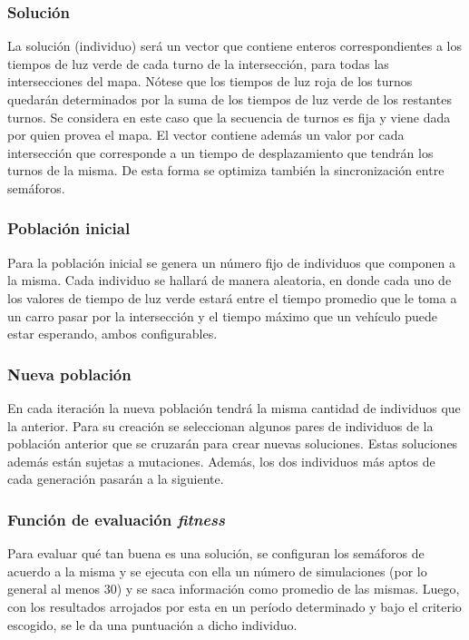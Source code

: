 \documentclass[colorinlistoftodos,twoside,twocolumn]{article} %
\begin{document}
	\subsubsection{Solución}
	
	La solución (individuo) será un vector que contiene enteros correspondientes a los tiempos de luz verde de cada turno de la intersección, para todas las intersecciones del mapa. N\'otese que los tiempos de luz roja de los turnos quedar\'an determinados por la suma de los tiempos de luz verde de los restantes turnos. Se considera en este caso que la secuencia de turnos es fija y viene dada por quien provea el mapa. El vector contiene adem\'as un valor por cada intersecci\'on que corresponde a un tiempo de desplazamiento que tendr\'an los turnos de la misma. De esta forma se optimiza tambi\'en la sincronizaci\'on entre sem\'aforos. 
	
	\subsubsection{Población inicial}
	
	Para  la población inicial se genera un n\'umero fijo de individuos que componen a la misma. Cada individuo se hallará de manera aleatoria, en donde cada uno de los valores de tiempo de luz verde estará entre el tiempo promedio que le toma a un carro pasar por la intersección y el tiempo máximo que un vehículo puede estar esperando, ambos configurables. 
	
	\subsubsection{Nueva población}
	En cada iteraci\'on la nueva poblaci\'on tendr\'a la misma cantidad de individuos que la anterior. Para su creaci\'on se seleccionan algunos pares de individuos de la poblaci\'on anterior que se cruzar\'an para crear nuevas soluciones. Estas soluciones adem\'as est\'an sujetas a mutaciones. Adem\'as, los dos individuos m\'as aptos de cada generaci\'on pasar\'an a la siguiente.  
	
	\subsubsection{Función de evaluación \textit{fitness}}
	
	Para evaluar qu\'e tan buena es una soluci\'on, se configuran los sem\'aforos de acuerdo a la misma y se ejecuta con ella un n\'umero de simulaciones (por lo general al menos 30) y se saca informaci\'on como promedio de las mismas. Luego, con los resultados arrojados por esta en un per\'iodo determinado y bajo el criterio escogido, se le da una puntuaci\'on a dicho individuo.
	
\end{document}
